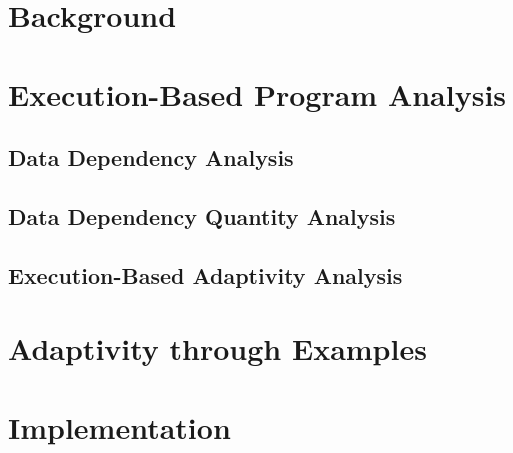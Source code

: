 \section{Background}
\label{sec:dynamic-intro}
% 


\section{Execution-Based Program Analysis}
\label{sec:dynamic-analysis}

\subsection{Data Dependency Analysis}
\label{subsec:dynamic-datadep}


\subsection{Data Dependency Quantity Analysis}
\label{subsec:dynamic-reachability}
%

\subsection{Execution-Based Adaptivity Analysis}
\label{subsec:dynamic-adapt}
%
%
\section{Adaptivity through Examples}
\label{sec:dynamic-examples}


\section{Implementation}
\label{sec:dynamic-implementation}
%
